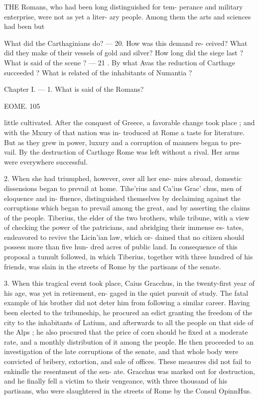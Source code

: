 \documentclass[openany,a4paper]{memoir}
\begin{document}
THE Romans, who had been long distinguished for tem- 
perance and military enterprise, were not as yet a liter- 
ary people. Among them the arts and sciences had been but 

What did the Carthaginians do? — 20. How was this demand re- 
ceived? What did they make of their vessels of gold and silver? 
How long did the siege last ? What is said of the scene ? — 21 . By 
what Avas the reduction of Carthage succeeded ? What is related of the 
inhabitants of Numantia ? 

Chapter I. — 1. What is said of the Romans? 



EOME. 105 

little cultivated. After the conquest of Greece, a favorable 
change took place ; and with the Mxury of that nation was in- 
troduced at Rome a taste for literature. But as they grew 
in power, luxury and a corruption of manners began to pre- 
vail. By the destruction of Carthage Rome was left without 
a rival. Her arms were everywhere successful. 

2. When she had triumphed, however, over all her ene- 
mies abroad, domestic dissensions began to prevail at home. 
Tihe'rius and Ca'ius Grac' chus, men of eloquence and in- 
fluence, distinguished themselves by declaiming against the 
corruptions which began to prevail among the great, and by 
asserting the claims of the people. Tiberius, the elder of the 
two brothers, while tribune, with a view of checking the 
power of the patricians, and abridging their immense es- 
tates, endeavored to revive the Licin'ian law, which or- 
dained that no citizen should possess more than five hun- 
dred acres of public land. In consequence of this proposal 
a tumult followed, in which Tiberius, together with three 
hundred of his friends, was slain in the streets of Rome by 
the partisans of the senate. 

3. When this tragical event took place, Caius Gracchus, 
in the twenty-first year of his age, was yet in retirement, en- 
gaged in the quiet pursuit of study. The fatal example of his 
brother did not deter him from following a similar career. 
Having been elected to the tribuneship, he procured an 
edict granting the freedom of the city to the inhabitants of 
Latium, and afterwards to all the people on that side of the 
Alps ; he also procured that the price of corn should be fixed 
at a moderate rate, and a monthly distribution of it among 
the people. He then proceeded to an investigation of the 
late corruptions of the senate, and that whole body were 
convicted of bribery, extortion, and sale of offices. These 
measures did not fail to enkindle the resentment of the sen- 
ate. Gracchus was marked out for destruction, and he finally 
fell a victim to their vengeance, with three thousand of his 
partisans, who were slaughtered in the streets of Rome by 
the Consul OpinnHus. 
\end{document}
